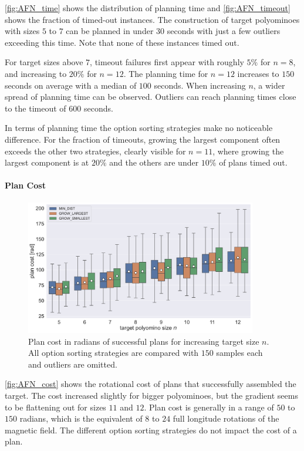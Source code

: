 \autoref{fig:AFN_time} shows the distribution of planning time and \autoref{fig:AFN_timeout} shows the fraction of timed-out instances.
The construction of target polyominoes with sizes $5$ to $7$ can be planned in under $30$ seconds with just a few outliers exceeding this time.
Note that none of these instances timed out.

For target sizes above $7$, timeout failures first appear with roughly $5\%$ for $n = 8$, and increasing to $20\%$ for $n=12$.
The planning time for $n = 12$ increases to $150$ seconds on average with a median of $100$ seconds.
When increasing $n$, a wider spread of planning time can be observed.
Outliers can reach planning times close to the timeout of $600$ seconds.

In terms of planning time the option sorting strategies make no noticeable difference.
For the fraction of timeouts, growing the largest component often exceeds the other two strategies, clearly visible for $n=11$, where growing the largest component is at $20\%$ and the others are under $10\%$ of plans timed out.

\newpage

\paragraph{Plan Cost}

\begin{figure}
	\centering
	\includegraphics[width=0.9\textwidth]{figures/plots/AFN_cost.pdf}
	\caption[Plan cost for increasing target size]{Plan cost in radians of successful plans for increasing target size $n$. All option sorting strategies are compared with $150$ samples each and outliers are omitted.}
	\label{fig:AFN_cost}
\end{figure}

\autoref{fig:AFN_cost} shows the rotational cost of plans that successfully assembled the target.
The cost increased slightly for bigger polyominoes, but the gradient seems to be flattening out for sizes $11$ and $12$.
Plan cost is generally in a range of $50$ to $150$ radians, which is the equivalent of $8$ to $24$ full longitude rotations of the magnetic field.
The different option sorting strategies do not impact the cost of a plan.

